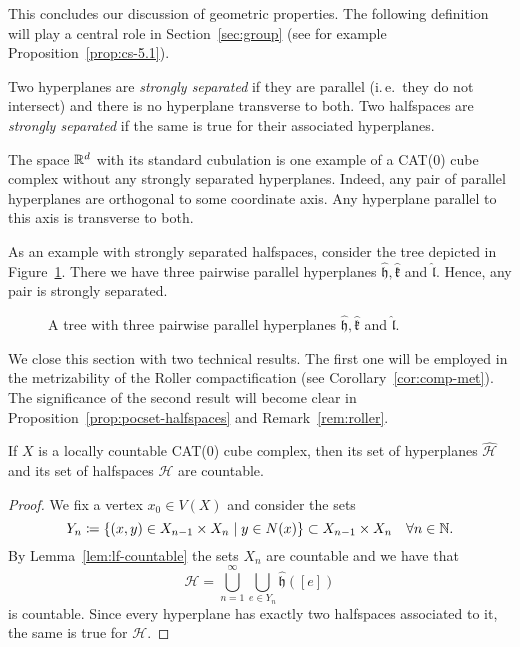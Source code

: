 This concludes our discussion of geometric properties. The following definition will play a central role in Section~\ref{sec:group} (see for example Proposition~\ref{prop:cs-5.1}).

\begin{defin}
  \label{defin:strong-sep}
  Two hyperplanes are \emph{strongly separated} if they are parallel (i.\,e.\ they do not intersect) and there is no hyperplane transverse to both. Two halfspaces are \emph{strongly separated} if the same is true for their associated hyperplanes.
\end{defin}

\begin{bsp}
  The space \(\mathbb{R}^d\) with its standard cubulation is one example of a CAT(0) cube complex without any strongly separated hyperplanes. Indeed, any pair of parallel hyperplanes are orthogonal to some coordinate axis. Any hyperplane parallel to this axis is transverse to both.

  As an example with strongly separated halfspaces, consider the tree depicted in Figure~\ref{fig:str-sep}. There we have three pairwise parallel hyperplanes \(\mathfrak{\hat h}, \mathfrak{\hat k}\) and \(\mathfrak{\hat l}\). Hence, any pair is strongly separated.

  \begin{figure}[htbp]
    \centering
    
    \caption{A tree with three pairwise parallel hyperplanes \(\mathfrak{\hat h}, \mathfrak{\hat k}\) and \(\mathfrak{\hat l}\).}
    \label{fig:str-sep}
  \end{figure}
\end{bsp}

We close this section with two technical results. The first one will be employed in the metrizability of the Roller compactification (see Corollary~\ref{cor:comp-met}). The significance of the second result will become clear in Proposition~\ref{prop:pocset-halfspaces} and Remark~\ref{rem:roller}.

\begin{cor}
  \label{cor:halfspace-countable}
  If \(X\) is a locally countable CAT(0) cube complex, then its set of hyperplanes \(\mathcal{\hat H}\) and its set of halfspaces \(\mathcal{H}\) are countable.
\end{cor}

\begin{proof}
  We fix a vertex \(x_0 \in V(X)\) and consider the sets
  \[
    Y_n \coloneqq \{(x,y) \in X_{n-1} \times X_{n} \mid y \in N(x)\} \subset X_{n-1} \times X_n \quad \forall n \in \mathbb{N}.
  \]
  By Lemma~\ref{lem:lf-countable} the sets \(X_n\) are countable and we have that
  \[
    \mathcal{\hat H} = \bigcup_{n=1}^\infty \bigcup_{e \in Y_n} \mathfrak{\hat h}([e])
  \]
  is countable. Since every hyperplane has exactly two halfspaces associated to it, the same is true for \(\mathcal{H}\).
\end{proof}

